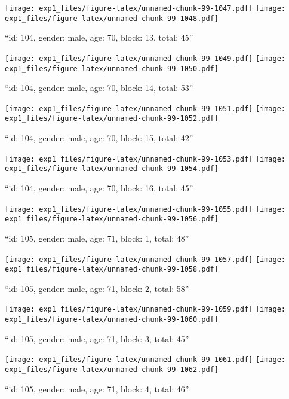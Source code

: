 \documentclass[,]{article}
\begin{document}
\texttt{[image: exp1\_files/figure-latex/unnamed-chunk-99-1047.pdf]}
\texttt{[image: exp1\_files/figure-latex/unnamed-chunk-99-1048.pdf]}

\newpage
[1] 

``id: 104, gender: male, age: 70, block: 13, total: 45''

\texttt{[image: exp1\_files/figure-latex/unnamed-chunk-99-1049.pdf]}
\texttt{[image: exp1\_files/figure-latex/unnamed-chunk-99-1050.pdf]}

\newpage
[1] 

``id: 104, gender: male, age: 70, block: 14, total: 53''

\texttt{[image: exp1\_files/figure-latex/unnamed-chunk-99-1051.pdf]}
\texttt{[image: exp1\_files/figure-latex/unnamed-chunk-99-1052.pdf]}

\newpage
[1] 

``id: 104, gender: male, age: 70, block: 15, total: 42''

\texttt{[image: exp1\_files/figure-latex/unnamed-chunk-99-1053.pdf]}
\texttt{[image: exp1\_files/figure-latex/unnamed-chunk-99-1054.pdf]}

\newpage
[1] 

``id: 104, gender: male, age: 70, block: 16, total: 45''

\texttt{[image: exp1\_files/figure-latex/unnamed-chunk-99-1055.pdf]}
\texttt{[image: exp1\_files/figure-latex/unnamed-chunk-99-1056.pdf]}

\newpage
[1] 

``id: 105, gender: male, age: 71, block: 1, total: 48''

\texttt{[image: exp1\_files/figure-latex/unnamed-chunk-99-1057.pdf]}
\texttt{[image: exp1\_files/figure-latex/unnamed-chunk-99-1058.pdf]}

\newpage
[1] 

``id: 105, gender: male, age: 71, block: 2, total: 58''

\texttt{[image: exp1\_files/figure-latex/unnamed-chunk-99-1059.pdf]}
\texttt{[image: exp1\_files/figure-latex/unnamed-chunk-99-1060.pdf]}

\newpage
[1] 

``id: 105, gender: male, age: 71, block: 3, total: 45''

\texttt{[image: exp1\_files/figure-latex/unnamed-chunk-99-1061.pdf]}
\texttt{[image: exp1\_files/figure-latex/unnamed-chunk-99-1062.pdf]}

\newpage
[1] 

``id: 105, gender: male, age: 71, block: 4, total: 46''
\end{document}
